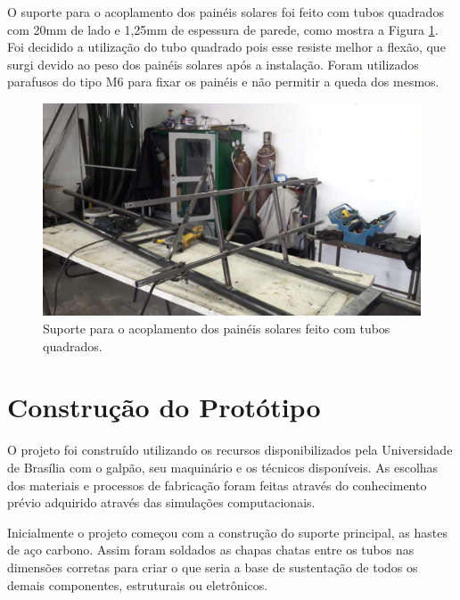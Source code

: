 O suporte para o acoplamento dos painéis solares foi feito com tubos quadrados com 20mm de lado e 1,25mm de espessura de parede, como mostra a Figura \ref{tuboquad}. Foi decidido a utilização do tubo quadrado pois esse resiste melhor a flexão, que surgi devido ao peso dos painéis solares após a instalação. Foram utilizados parafusos do tipo M6 para fixar os painéis e não permitir a queda dos mesmos.

\begin{figure}[H]
	\centering
    \includegraphics[keepaspectratio=true,scale=0.43]{figuras/suportepainel1.jpg}
    \caption{Suporte para o acoplamento dos painéis solares feito com tubos quadrados.}
    \label{tuboquad}
\end{figure}


\section{Construção do Protótipo}

O projeto foi construído utilizando os recursos disponibilizados pela Universidade de Brasília com o galpão, seu maquinário e os técnicos disponíveis. As escolhas dos materiais e processos de fabricação foram feitas através do conhecimento prévio adquirido através das simulações computacionais.

Inicialmente o projeto começou com a construção do suporte principal, as hastes de aço carbono. Assim foram soldados as chapas chatas entre os tubos nas dimensões corretas para criar o que seria a base de sustentação de todos os demais componentes, estruturais ou eletrônicos. 

